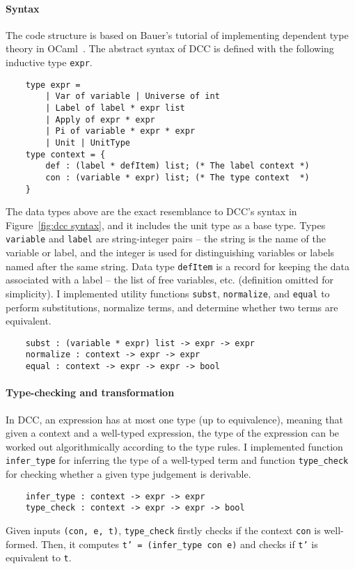 \paragraph{Syntax} The code structure is based on Bauer's tutorial of implementing dependent type theory in OCaml~\cite{ImplementDependentType}.
The abstract syntax of DCC is defined with the following inductive type \texttt{expr}.
\begin{lstlisting}
    type expr = 
        | Var of variable | Universe of int
        | Label of label * expr list
        | Apply of expr * expr
        | Pi of variable * expr * expr
        | Unit | UnitType
    type context = {
        def : (label * defItem) list; (* The label context *)
        con : (variable * expr) list; (* The type context  *)
    }
\end{lstlisting}
The data types above are the exact resemblance to DCC's syntax in Figure~\ref{fig:dcc syntax}, and it includes the unit type as a base type. Types \texttt{variable} and \texttt{label} are string-integer pairs -- the string is the name of the variable or label, and the integer is used for distinguishing variables or labels named after the same string. Data type \texttt{defItem} is a record for keeping the data associated with a label -- the list of free variables, etc. (definition omitted for simplicity). I implemented utility functions \texttt{subst}, \texttt{normalize}, and \texttt{equal} to perform substitutions, normalize terms, and determine whether two terms are equivalent. 
\begin{lstlisting}
    subst : (variable * expr) list -> expr -> expr
    normalize : context -> expr -> expr
    equal : context -> expr -> expr -> bool
\end{lstlisting}

\paragraph{Type-checking and transformation}
In DCC, an expression has at most one type (up to equivalence), meaning that given a context and a well-typed expression, the type of the expression can be worked out algorithmically according to the type rules. I implemented function \texttt{infer\_type} for inferring the type of a well-typed term and function \texttt{type\_check} for checking whether a given type judgement is derivable. 
\begin{lstlisting}
    infer_type : context -> expr -> expr
    type_check : context -> expr -> expr -> bool
\end{lstlisting}
Given inputs \texttt{(con, e, t)}, \texttt{type\_check} firstly checks if the context \texttt{con} is well-formed. Then, it computes \texttt{t' = (infer\_type con e)} and checks if \texttt{t'} is equivalent to \texttt{t}. 

